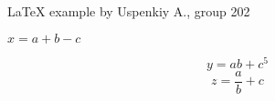 \documentclass[11pt]{article}
\begin{document}
\begin{center}
\Large{
\LaTeX{} example by Uspenkiy A., group 202}
\end{center}
\lipsum[1]
$x = a + b - c$

\lipsum[2]
$$y = ab + c^5$$
\lipsum[3]
\begin{equation}
	z = \frac{a}{b} + c
\end{equation}
\end{document}

